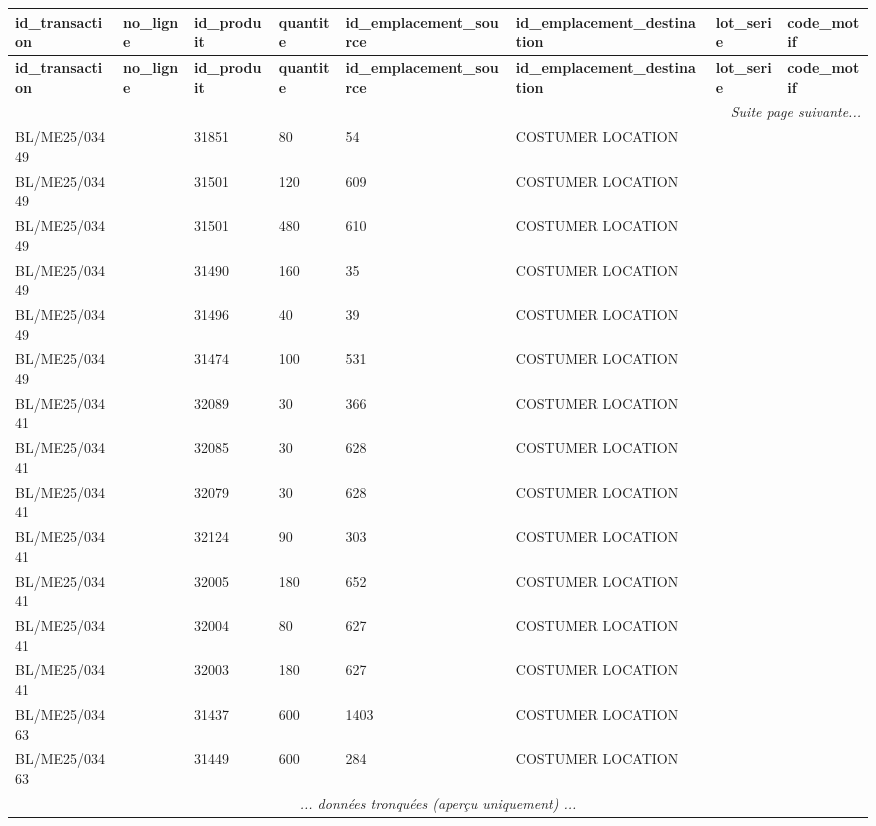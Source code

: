 \documentclass[a4paper,11pt]{article}
\begin{document}
\begin{landscape}
\tiny
\begin{longtable}{|l|l|l|l|l|l|l|l|}
\hline
\rowcolor{headerblue}
\textbf{id\_transaction} & \textbf{no\_ligne} & \textbf{id\_produit} & \textbf{quantite} & \textbf{id\_emplacement\_source} & \textbf{id\_emplacement\_destination} & \textbf{lot\_serie} & \textbf{code\_motif} \\ \hline
\endfirsthead
\hline
\rowcolor{headerblue}
\textbf{id\_transaction} & \textbf{no\_ligne} & \textbf{id\_produit} & \textbf{quantite} & \textbf{id\_emplacement\_source} & \textbf{id\_emplacement\_destination} & \textbf{lot\_serie} & \textbf{code\_motif} \\ \hline
\endhead
\hline \multicolumn{8}{|r|}{\textit{Suite page suivante...}} \\ \hline
\endfoot
\hline
\endlastfoot
 BL/ME25/03449 &  & 31851 & 80 & 54 & COSTUMER LOCATION &  &  \\ \hline
\rowcolor{rowgray} BL/ME25/03449 &  & 31501 & 120 & 609 & COSTUMER LOCATION &  &  \\ \hline
 BL/ME25/03449 &  & 31501 & 480 & 610 & COSTUMER LOCATION &  &  \\ \hline
\rowcolor{rowgray} BL/ME25/03449 &  & 31490 & 160 & 35 & COSTUMER LOCATION &  &  \\ \hline
 BL/ME25/03449 &  & 31496 & 40 & 39 & COSTUMER LOCATION &  &  \\ \hline
\rowcolor{rowgray} BL/ME25/03449 &  & 31474 & 100 & 531 & COSTUMER LOCATION &  &  \\ \hline
 BL/ME25/03441 &  & 32089 & 30 & 366 & COSTUMER LOCATION &  &  \\ \hline
\rowcolor{rowgray} BL/ME25/03441 &  & 32085 & 30 & 628 & COSTUMER LOCATION &  &  \\ \hline
 BL/ME25/03441 &  & 32079 & 30 & 628 & COSTUMER LOCATION &  &  \\ \hline
\rowcolor{rowgray} BL/ME25/03441 &  & 32124 & 90 & 303 & COSTUMER LOCATION &  &  \\ \hline
 BL/ME25/03441 &  & 32005 & 180 & 652 & COSTUMER LOCATION &  &  \\ \hline
\rowcolor{rowgray} BL/ME25/03441 &  & 32004 & 80 & 627 & COSTUMER LOCATION &  &  \\ \hline
 BL/ME25/03441 &  & 32003 & 180 & 627 & COSTUMER LOCATION &  &  \\ \hline
\rowcolor{rowgray} BL/ME25/03463 &  & 31437 & 600 & 1403 & COSTUMER LOCATION &  &  \\ \hline
 BL/ME25/03463 &  & 31449 & 600 & 284 & COSTUMER LOCATION &  &  \\ \hline
\multicolumn{8}{|c|}{\textit{... données tronquées (aperçu uniquement) ...}} \\ \hline
\end{longtable}
\end{landscape}
\normalsize
\end{document}
